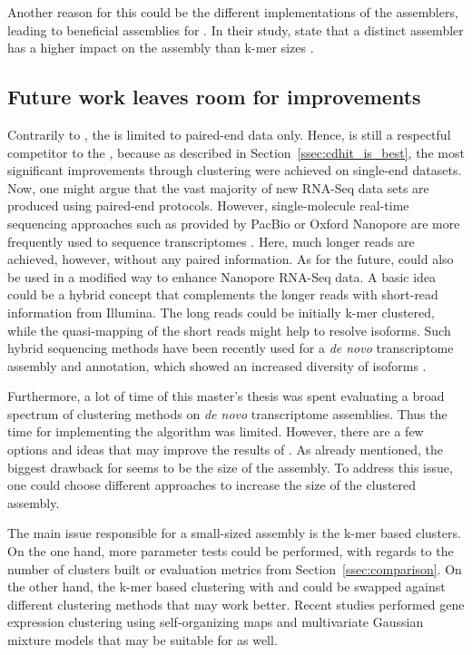 \documentclass[12pt,a4paper,english]{article}
\begin{document}
		Another reason for this could be the different implementations of the assemblers, leading to beneficial assemblies for \soap. In their study, \citeauthor{Rana:16} state that a distinct assembler has a higher impact on the assembly than k-mer sizes \citep{Rana:16}.
	
	\subsection{Future work leaves room for improvements}
    Contrarily to \karma, the \orp is limited to paired-end data only.
	Hence, \karma is still a respectful competitor to the \orp, because as described in Section~\ref{ssec:cdhit_is_best}, the most significant improvements through clustering were achieved on single-end datasets. Now, one might argue that the vast majority of new RNA-Seq data sets are produced using paired-end protocols. However, single-molecule real-time sequencing approaches such as provided by PacBio \citep{smrt:pacbio:09} or Oxford Nanopore \citep{smrt:ont:16} are more frequently used to sequence transcriptomes \citep{smrt:17}. Here, much longer reads are achieved, however, without any paired information.
	As for the future, \karma could also be used in a modified way to enhance Nanopore RNA-Seq data. 
	A basic idea could be a hybrid concept that complements the longer reads with short-read information from Illumina. The long reads could be initially k-mer clustered, while the quasi-mapping of the short reads might help to resolve isoforms. Such hybrid sequencing methods have been recently used for a \textit{de novo} transcriptome assembly and annotation, which showed an increased diversity of isoforms \citep{idp:18}.    
	
	Furthermore, a lot of time of this master's thesis was spent evaluating a broad spectrum of clustering methods on \textit{de novo} transcriptome assemblies. Thus the time for implementing the algorithm was limited.
	However, there are a few options and ideas that may improve the results of \karma.
	As already mentioned, the biggest drawback for \karma seems to be the size of the assembly.
	To address this issue, one could choose different approaches to increase the size of the clustered assembly.
	
	The main issue responsible for a small-sized assembly is the k-mer based clusters. On the one hand, more parameter tests could be performed, with regards to the number of clusters built or evaluation metrics from Section~\ref{ssec:comparison}. On the other hand, the k-mer based clustering with \umap and \hdbscan could be swapped against different clustering methods that may work better. Recent studies performed gene expression clustering using self-organizing maps \citep{gene_clustering:19} and multivariate Gaussian mixture models \citep{gene_clustering:16} that may be suitable for \karma as well.
	
\end{document}
